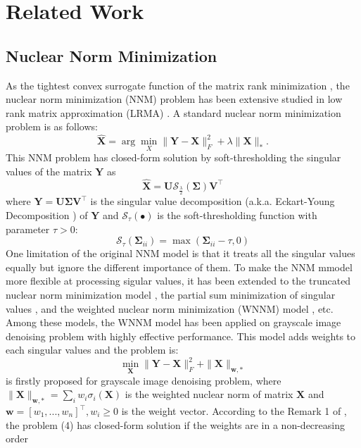 \documentclass[10pt,twocolumn,letterpaper]{article}
\begin{document}
\section{Related Work}

\subsection{Nuclear Norm Minimization}
As the tightest convex surrogate function of the matrix rank minimization \cite{Guaranteed,fazelPhDthesis}, the nuclear norm minimization (NNM) problem has been extensive studied in low rank matrix approximation (LRMA) \cite{srebro2003weighted,cai2010singular,candes2011robust,lin2011linearized}. A standard nuclear norm minimization problem is as follows:
\begin{equation}
\mathbf{\hat{X}}
=
\arg
\min_{X}
\|\mathbf{Y}-\mathbf{X}\|_{F}^{2}
+
\lambda
\|\mathbf{X}\|_{*}.
\end{equation}
This NNM problem has closed-form solution by soft-thresholding the singular values of the matrix $\mathbf{Y}$ as 
\begin{equation}
\mathbf{\hat{X}}
=
\mathbf{U}
\mathcal{S}_{\frac{\lambda}{2}}
(\mathbf{\Sigma})
\mathbf{V}^{\top}
\end{equation}
where $\mathbf{Y}=\mathbf{U}\mathbf{\Sigma}\mathbf{V}^{\top}$ is the singular value decomposition (a.k.a. Eckart-Young Decomposition \cite{eckart1936approximation}) of $\mathbf{Y}$ and 
$\mathcal{S}_{\tau}(\bullet)$ is the soft-thresholding function with parameter $\tau>0$:
\begin{equation}
\mathcal{S}_{\tau}
(\mathbf{\Sigma}_{ii})
=
\max(\mathbf{\Sigma}_{ii}-\tau, 0)
\end{equation}
One limitation of the original NNM model is that it treats all the singular values equally but ignore the different importance of them. To make the NNM mmodel more flexible at processing sigular values, it has been extended to the truncated nuclear norm minimization model \cite{tnnm}, the partial sum minimization of singular values \cite{PartialSum}, and the weighted nuclear norm minimization (WNNM) model \cite{wnnm}, etc. Among these models, the WNNM model has been applied on grayscale image denoising problem with highly effective performance. This model adds weights to each singular values and the problem is:
\begin{equation}
\min_{\mathbf{X}}\|\mathbf{Y}-\mathbf{X}\|_{F}^{2}
+
\|\mathbf{X}\|_{\bm{w},*}
\end{equation}
is firstly proposed for grayscale image denoising problem, where $\|\mathbf{X}\|_{\bm{w},*}=\sum_{i}w_{i}\sigma_{i}(\mathbf{X})$ is the weighted nuclear norm of matrix $\mathbf{X}$ and $\bm{w}=[w_{1},...,w_{n}]^{\top}, w_{i}\ge 0$ is the weight vector. According to the Remark 1 of \cite{wnnmijcv}, the problem (4) has closed-form solution if the weights are in a non-decreasing order
\end{document}
